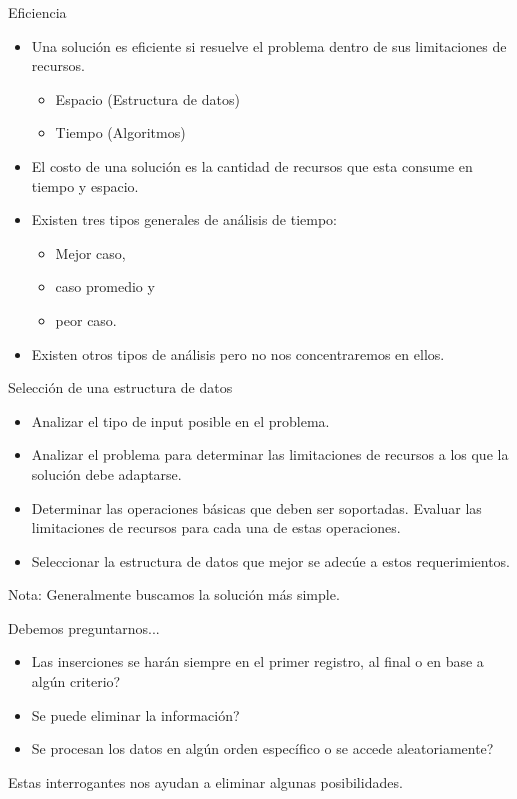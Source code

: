 \documentclass[aspectratio=169]{beamer}
\begin{document}
\begin{frame}{Eficiencia}
  \begin{itemize}
    \item Una solución es eficiente si resuelve el problema dentro de sus limitaciones de recursos.
    \begin{itemize}
      \item Espacio (Estructura de datos)
      \item Tiempo (Algoritmos)
    \end{itemize}
    \item El costo de una solución es la cantidad de recursos que esta consume en tiempo y espacio.
    \item Existen tres tipos generales de análisis de tiempo:
    \begin{itemize}
      \item Mejor caso,
      \item caso promedio y
      \item peor caso.
    \end{itemize}
    \item Existen otros tipos de análisis pero no nos concentraremos en ellos.
  \end{itemize}
\end{frame}

\begin{frame}{Selección de una estructura de datos}
  \begin{itemize}
    \item Analizar el tipo de input posible en el problema.
    \item Analizar el problema para determinar las limitaciones de recursos a los que la solución debe adaptarse.
    \item Determinar las operaciones básicas que deben ser soportadas. Evaluar las limitaciones de recursos para cada una de estas operaciones.
    \item Seleccionar la estructura de datos que mejor se adecúe a estos requerimientos.
  \end{itemize}
  Nota: Generalmente buscamos la solución más simple.
\end{frame}

\begin{frame}{Debemos preguntarnos...}
  \begin{itemize}
    \item Las inserciones se harán siempre en el primer registro, al final o en base a algún criterio?
    \item Se puede eliminar la información?
    \item Se procesan los datos en algún orden específico o se accede aleatoriamente?
  \end{itemize}
  Estas interrogantes nos ayudan a eliminar algunas posibilidades.
\end{frame}
\end{document}

